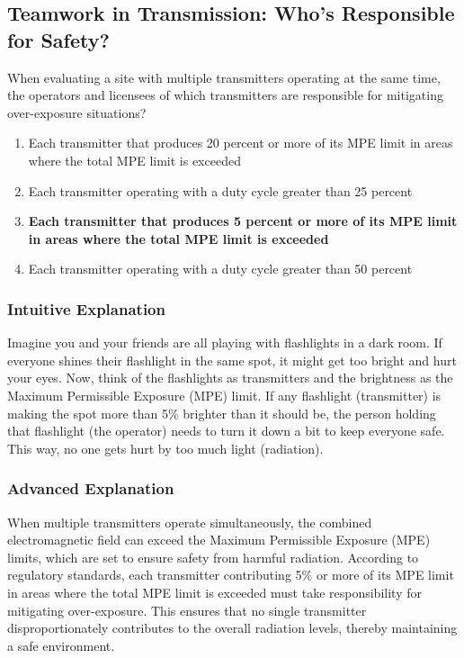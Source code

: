 \subsection{Teamwork in Transmission: Who's Responsible for Safety?}

\begin{tcolorbox}[colback=gray!10!white,colframe=black!75!black,title=\textbf{E0A04}]
When evaluating a site with multiple transmitters operating at the same time, the operators and licensees of which transmitters are responsible for mitigating over-exposure situations?
\begin{enumerate}[label=\Alph*.]
    \item Each transmitter that produces 20 percent or more of its MPE limit in areas where the total MPE limit is exceeded
    \item Each transmitter operating with a duty cycle greater than 25 percent
    \item \textbf{Each transmitter that produces 5 percent or more of its MPE limit in areas where the total MPE limit is exceeded}
    \item Each transmitter operating with a duty cycle greater than 50 percent
\end{enumerate}
\end{tcolorbox}

\subsubsection{Intuitive Explanation}
Imagine you and your friends are all playing with flashlights in a dark room. If everyone shines their flashlight in the same spot, it might get too bright and hurt your eyes. Now, think of the flashlights as transmitters and the brightness as the Maximum Permissible Exposure (MPE) limit. If any flashlight (transmitter) is making the spot more than 5\% brighter than it should be, the person holding that flashlight (the operator) needs to turn it down a bit to keep everyone safe. This way, no one gets hurt by too much light (radiation).

\subsubsection{Advanced Explanation}
When multiple transmitters operate simultaneously, the combined electromagnetic field can exceed the Maximum Permissible Exposure (MPE) limits, which are set to ensure safety from harmful radiation. According to regulatory standards, each transmitter contributing 5\% or more of its MPE limit in areas where the total MPE limit is exceeded must take responsibility for mitigating over-exposure. This ensures that no single transmitter disproportionately contributes to the overall radiation levels, thereby maintaining a safe environment.

